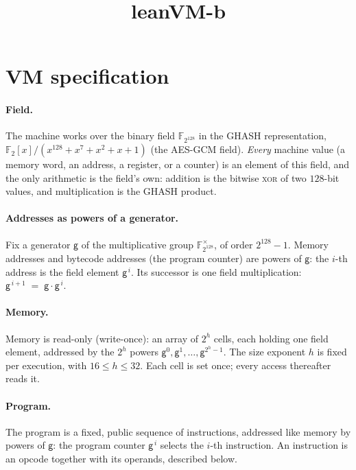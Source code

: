 \documentclass[11pt]{article}
\title{\bf leanVM-b}
\author{}
\date{}
\newcommand{\F}{\mathbb{F}}
\newcommand{\gen}{\mathsf{g}}
\begin{document}
\maketitle


\tableofcontents
\newpage

\section{VM specification}\label{sec:vm}

\paragraph{Field.} The machine works over the binary field $\F_{2^{128}}$ in the GHASH representation, $\F_2[x]/(x^{128}+x^7+x^2+x+1)$ (the AES-GCM field). \emph{Every} machine value (a memory word, an address, a register, or a counter) is an element of this field, and the only arithmetic is the field's own: addition is the bitwise \textsc{xor} of two $128$-bit values, and multiplication is the GHASH product.

\paragraph{Addresses as powers of a generator.} Fix a generator $\gen$ of the multiplicative group $\F_{2^{128}}^{\times}$, of order $2^{128}-1$. Memory addresses and bytecode addresses (the program counter) are powers of $\gen$: the $i$-th address is the field element $\gen^{\,i}$. Its successor is one field multiplication: $\gen^{\,i+1}\;=\;\gen\cdot\gen^{\,i}$.

\paragraph{Memory.} Memory is read-only (write-once): an array of $2^{h}$ cells, each holding one field element, addressed by the $2^{h}$ powers $\gen^{0},\gen^{1},\dots,\gen^{2^{h}-1}$. The size exponent $h$ is fixed per execution, with $16\le h\le 32$. Each cell is set once; every access thereafter reads it.

\paragraph{Program.} The program is a fixed, public sequence of instructions, addressed like memory by powers of $\gen$: the program counter $\gen^{\,i}$ selects the $i$-th instruction. An instruction is an opcode together with its operands, described below.
\end{document}
